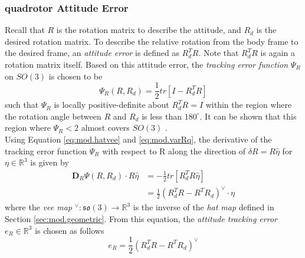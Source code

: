 \subsubsection*{quadrotor Attitude Error}
Recall that $ R $ is the rotation matrix to describe the  attitude, and $ R_d $ is the desired rotation matrix. To describe the relative rotation from the body frame to the desired frame, an \textit{attitude error} is defined as $ R^T_dR $. Note that $ R^T_dR $ is again a rotation matrix itself.
Based on this attitude error, the \textit{tracking error function} $ \Psi_R $ on $ SO(3) $ is chosen to be 
\begin{equation}\label{eq:psiR}
\Psi_R(R,R_d)=\frac{1}{2}tr\left[I-R_d^TR\right]
\end{equation}
such that $ \Psi_R $ is locally positive-definite about $ R^T_dR=I $ within the region where the rotation angle between $ R $ and $ R_d $ is less than $ 180^\circ $. 
It can be shown that this region where $ \Psi_R<2 $ almost covers $ SO(3) $ \cite{Lee2010c}.\\
Using Equation \ref{eq:mod.hatvee} and \ref{eq:mod.varRq}, the derivative of the tracking error function $ \Psi_R $ with respect to R along the direction of $ \delta R=R\hat{\eta} $ for $ \eta\in\mathbb{R}^3 $ is given by
\begin{equation}\label{key}
\begin{aligned}
\mathbf{D}_R\Psi(R,R_d)\cdot R\hat{\eta}&=-\frac{1}{2}tr[R_d^TR\hat{\eta}]\\
&=\frac{1}{2}(R^T_dR-R^TR_d)^\vee\cdot\eta
\end{aligned}
\end{equation}
where the \textit{vee map} $ ^\vee:\mathfrak{so}(3)\rightarrow\mathbb{R}^3 $ is the inverse of the \textit{hat map} defined in Section \ref{sec:mod.geometric}. From this equation, the  \textit{attitude tracking error} $ e_R \in \mathbb{R}^3$ is chosen as follows
\begin{equation}\label{eq:con.eR}
e_R=\frac{1}{2}(R_d^TR-R^TR_d)^\vee
\end{equation}
